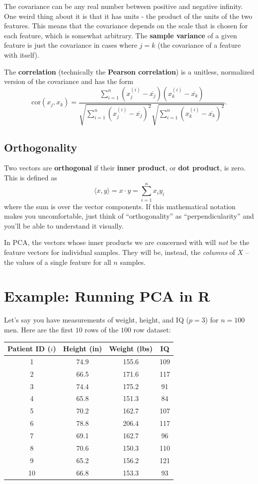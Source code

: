 The covariance can be any real number between positive and negative infinity. One weird thing about it is that it has units - the product of the units of the two features. This means that the covariance depends on the scale that is chosen for each feature, which is somewhat arbitrary. The \textbf{sample variance} of a given feature is just the covariance in cases where $j = k$ (the covariance of a feature with itself). 

The \textbf{correlation} (technically the \textbf{Pearson correlation}) is a unitless, normalized version of the covariance and has the form
$$ \text{cor}(x_j, x_k)=\frac{\sum_{i=1}^{n}(x_j^{(i)}-\overline{x_j})(x_k^{(i)}-\overline{x_k})}{\sqrt{\sum_{i=1}^{n}(x_j^{(i)}-\overline{x_j})^2}{\sqrt{\sum_{i=1}^{n}(x_k^{(i)}-\overline{x_k})^2}}}. $$

\subsection{Orthogonality}

Two vectors are \textbf{orthogonal} if their \textbf{inner product}, or \textbf{dot product}, is zero. This is defined as
$$ \langle x, y \rangle = x \cdot y = \sum_{i=1}^n x_i y_i $$
where the sum is over the vector components. If this mathematical notation makes you uncomfortable, just think of ``orthogonality'' as ``perpendicularity'' and you'll be able to understand it visually. 

In PCA, the vectors whose inner products we are concerned with will \emph{not} be the feature vectors for individual samples. They will be, instead, the \emph{columns} of $X$ -- the values of a single feature for all $n$ samples. 


\section{Example: Running PCA in R}

Let's say you have measurements of weight, height, and IQ ($p=3$) for $n=100$ men. Here are the first $10$ rows of the $100$ row dataset:

\begin{center}
\begin{tabular}{cccc}
Patient ID ($i$) & Height (in) & Weight (lbs) & IQ \\
\midrule
1 & 74.9 & 155.6 & 109 \\
2 & 66.5 & 171.6 & 117 \\
3 & 74.4 & 175.2 & 91 \\
4 & 65.8 & 151.3 & 84 \\
5 & 70.2 & 162.7 & 107 \\
6 & 78.8 & 206.4 & 117 \\
7 & 69.1 & 162.7 & 96 \\
8 & 70.6 & 150.3 & 110 \\
9 & 65.2 & 156.2 & 121 \\
10 & 66.8 & 153.3 & 93 \\
\end{tabular}
\end{center}

